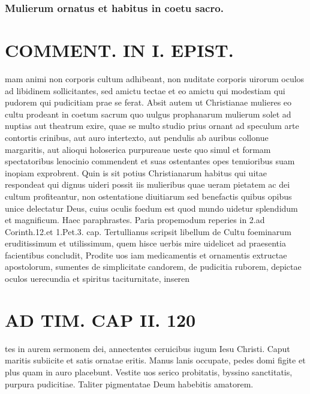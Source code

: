 \documentclass{article}
\begin{document}
\begin{pages}
\subsubsection*{Mulierum ornatus et habitus in coetu sacro. }
\section*{COMMENT. IN I. EPIST. }\pstart mam animi non corporis cultum adhibeant, non nuditate corporis uirorum oculos ad libidinem sollicitantes, sed amictu tectae et eo amictu qui modestiam qui pudorem qui pudicitiam prae se ferat. Absit autem ut Christianae mulieres eo cultu prodeant in coetum sacrum quo uulgus prophanarum mulierum solet ad nuptias aut theatrum exire, quae se multo studio prius ornant ad speculum arte contortis crinibus, aut auro intertexto, aut pendulis ab auribus collonue margaritis, aut alioqui holoserica purpureaue ueste quo simul et formam spectatoribus lenocinio commendent et suas ostentantes opes tenuioribus suam inopiam exprobrent. Quin is sit potius Christianarum habitus qui uitae respondeat qui dignus uideri possit iis mulieribus quae ueram pietatem ac dei cultum profiteantur, non ostentatione diuitiarum sed benefactis quibus opibus unice delectatur Deus, cuius oculis foedum est quod mundo uidetur splendidum et magnificum. Haec paraphrastes. Paria propemodum reperies in 2.ad Corinth.12.et 1.Pet.3. cap. Tertullianus scripsit libellum de Cultu foeminarum eruditissimum et utilissimum, quem hisce uerbis mire uidelicet ad praesentia facientibus concludit, Prodite uos iam medicamentis et ornamentis extructae apostolorum, sumentes de simplicitate candorem, de pudicitia ruborem, depictae oculos uerecundia et spiritus taciturnitate, inseren\pend
\section*{AD TIM. CAP II. 120 }\pstart tes in aurem sermonem dei, annectentes ceruicibus iugum Iesu Christi. Caput maritis subiicite et satis ornatae eritis. Manus lanis occupate, pedes domi figite et plus quam in auro placebunt. Vestite uos serico probitatis, byssino sanctitatis, purpura pudicitiae. Taliter pigmentatae Deum habebitis amatorem.  \pend 
{}
{}

\end{pages}
\end{document}
